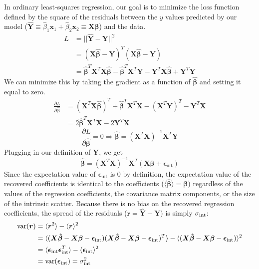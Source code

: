 In ordinary least-squares regression, our goal is to minimize the loss function defined by the square of the residuals between the $y$ values predicted by our model ($\hat{\bm{Y}}\equiv\hat{\beta}_1\bm{x}_1 +\hat{\beta}_2\bm{x}_2\equiv\bm{X\hat{\beta}}$) and the data. 
\begin{align*}
    L &= ||\hat{\bm{Y}}-\bm{Y}||^2\\
    &= (\bm{X\hat{\beta}}-\bm{Y})^T(\bm{X\hat{\beta}}-\bm{Y})\\
    &= \bm{\hat{\beta}}^T\bm{X}^T\bm{X\hat{\beta}}
    - \bm{\hat{\beta}}^T\bm{X}^T\bm{Y}
    - \bm{Y}^T\bm{X\hat{\beta}}
    + \bm{Y}^T\bm{Y}
\end{align*}
We can minimize this by taking the gradient as a function of $\bm{\hat{\beta}}$ and setting it equal to zero.
\begin{align*}
    \frac{\partial L}{\partial\bm{\hat{\beta}}} &=
    (\bm{X}^T\bm{X}\bm{\hat{\beta}})^T
    + \bm{\hat{\beta}}^T\bm{X}^T\bm{X}
    - (\bm{X}^T\bm{Y})^T
    - \bm{Y}^T\bm{X}\\
    &= 2\bm{\hat{\beta}}^T\bm{X}^T\bm{X} - 2\bm{Y}^T\bm{X}
\end{align*}
$$\frac{\partial L}{\partial\bm{\hat{\beta}}} = 0 \Rightarrow \bm{\hat{\beta}}=(\bm{X}^T\bm{X})^{-1}\bm{X}^T\bm{Y}$$
Plugging in our definition of $\bm{Y}$, we get
\begin{equation}
    \bm{\hat{\beta}} = (\bm{X}^T\bm{X})^{-1}\bm{X}^T(\bm{X\beta} + \bm{\epsilon}_\text{int})
\label{eqn:sim_beta_vec}
\end{equation}
Since the expectation value of $\bm{\epsilon}_\text{int}$ is 0 by definition, the expectation value of the recovered coefficients is identical to the coefficients ($\langle\bm{\hat{\beta}}\rangle=\bm{\beta}$) regardless of the values of the regression coefficients, the covariance matrix components, or the size of the intrinsic scatter. Because there is no bias on the recovered regression coefficients, the spread of the residuals ($\bm{r}=\bm{\hat{Y}}-\bm{Y}$) is simply $\sigma_{\text{int}}$:
\begin{align*}
    \text{var}(\bm{r}) &= \langle\bm{r}^2\rangle - \langle\bm{r}\rangle^2\\
    &= \langle(\bm{X\hat{\beta}}-\bm{X\beta}-\bm{\epsilon}_\text{int})(\bm{X\hat{\beta}}-\bm{X\beta}-\bm{\epsilon}_\text{int})^T\rangle - \langle(\bm{X\hat{\beta}}-\bm{X\beta}-\bm{\epsilon}_\text{int})\rangle^2\\
    &= \langle\bm{\epsilon}_\text{int}\bm{\epsilon}_\text{int}^T\rangle - \langle\bm{\epsilon}_\text{int}\rangle^2\\
    &= \text{var}(\bm{\epsilon}_\text{int}) = \sigma_{\text{int}}^2
\end{align*}

